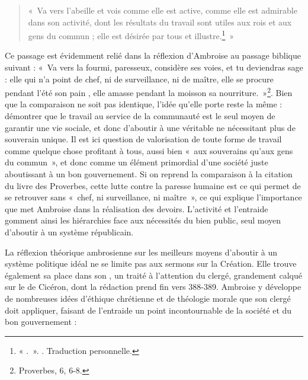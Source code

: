\bigskip

\begin{quote}
    «~Va vers l’abeille et vois comme elle est active, comme elle est admirable dans son activité, dont les résultats du travail sont utiles aux rois et aux gens du commun ; elle est désirée par tous et illustre.\footnote{« .~». \cite[\nopp V, 21, 70]{ambroise_csel_32_1}. Traduction personnelle.}~»
\end{quote}

\bigskip

Ce passage est évidemment relié dans la réflexion d'Ambroise au passage biblique suivant : «~Va vers la fourmi, paresseux, considère ses voies, et tu deviendras sage : elle qui n’a point de chef, ni de surveillance, ni de maître, elle se procure pendant l’été son pain , elle amasse pendant la moisson sa nourriture.~»\footnote{Proverbes, 6, 6-8.}. Bien que la comparaison ne soit pas identique, l'idée qu'elle porte reste la même : démontrer que le travail au service de la communauté est le seul moyen de garantir une vie sociale, et donc d'aboutir à une véritable  ne nécessitant plus de souverain unique. Il est ici question de valorisation de toute forme de travail comme quelque chose profitant à tous, aussi bien «~aux souverains qu'aux gens du commun~», et donc comme un élément primordial d'une société juste aboutissant à un bon gouvernement. Si on reprend la comparaison à la citation du livre des Proverbes, cette lutte contre la paresse humaine est ce qui permet de se retrouver sans «~chef, ni surveillance, ni maître~», ce qui explique l'importance que met Ambroise dans la réalisation des devoirs. L'activité et l'entraide gomment ainsi les hiérarchies face aux nécessités du bien public, seul moyen d'aboutir à un système républicain.

\bigskip

La réflexion théorique ambrosienne sur les meilleurs moyens d'aboutir à un système politique idéal ne se limite pas aux sermons sur la Création. Elle trouve également sa place dans son , un traité à l'attention du clergé, grandement calqué sur le  de Cicéron, dont la rédaction prend fin vers 388-389. Ambroise y développe de nombreuses idées d'éthique chrétienne et de théologie morale que son clergé doit appliquer, faisant de l'entraide un point incontournable de la société et du bon gouvernement :

